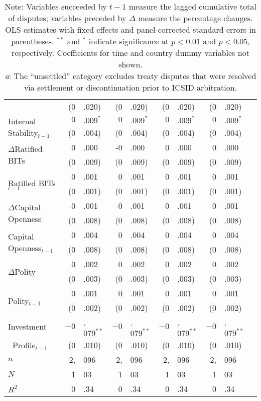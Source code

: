 \documentclass[12pt,onesided]{amsart}
\begin{document}
\begin{table}[ht]
{\begin{tabular}{lr@{} lr@{}lr@{}lr@{}lr@{}}
  & (0&.020) &  (0&.020) &  (0&.020) &  (0&.020) \\
  \multirow{2}{*}{Internal Stability$_{t-1}$} & $0$&$.009^{\ast}$ &  $0$&$.009^{\ast}$ &  $0$&$.009^{\ast}$ &  $0$&$.009^{\ast}$ \\
  & (0&.004) &  (0&.004) &  (0&.004) &  (0&.004) \\
  \multirow{2}{*}{$\Delta$Ratified BITs} & 0&.000 &  -0&.000 &  0&.000 &  0&.000 \\
  & (0&.009) &  (0&.009) &  (0&.009) &  (0&.009) \\
  \multirow{2}{*}{Ratified BITs$_{t-1}$} & 0&.001 & 0&.001 &  0&.001 &  0&.001 \\
  & (0&.001) & (0&.001) &  (0&.001) &  (0&.001) \\
  \multirow{2}{*}{$\Delta$Capital Openness} & -0&.001 & -0&.001 &  -0&.001 &  -0&.001 \\
  & (0&.008) &  (0&.008) &  (0&.008) &  (0&.008) \\
  \multirow{2}{*}{Capital Openness$_{t-1}$} & 0&.004 & 0&.004 &  0&.004 &  0&.004 \\
  & (0&.008) & (0&.008) & (0&.008) & (0&.008) \\
  \multirow{2}{*}{$\Delta$Polity} & 0&.002 & 0&.002 &  0&.002 &  0&.002  \\
  & (0&.003) & (0&.003) &  (0&.003) &  (0&.003) \\
  \multirow{2}{*}{Polity$_{t-1}$} & 0&.001 & 0&.001 &  0&.001 &  0&.001 \\
  & (0&.002) & (0&.002) &  (0&.002) &  (0&.002) \\
    Investment & $-0$&.$079^{\ast\ast}$ & $-0$&.$079^{\ast\ast}$ & $-0$&.$079^{\ast\ast}$ & $-0$&.$079^{\ast\ast}$ \\
  $\;\;$Profile$_{t-1}$ & (0&.010) & (0&.010) & (0&.010) & (0&.010) \\
	\hline
	$n$ & 2,&096 & 2,&096 & 2,&096 & 2,&096 \\
	$N$ & 1&03 & 1&03 & 1&03 & 1&03 \\
	$R^{2}$ & 0&.34 & 0&.34 & 0&.34 & 0&.34 \\
	\hline\hline
\end{tabular}
\caption*{Note: Variables succeeded by ${t-1}$ measure the lagged cumulative total of disputes; variables preceded by $\Delta$ measure the percentage changes. OLS estimates with fixed effects and panel-corrected standard errors in parentheses. $^{**}$ and $^{*}$ indicate significance at $p<0.01$ and $p<0.05$, respectively. Coefficients for time and country dummy variables not shown. \\ \textit{a}: The ``unsettled'' category excludes treaty disputes that were resolved via settlement or discontinuation prior to ICSID arbitration.}
}
\end{table}
\end{document}
